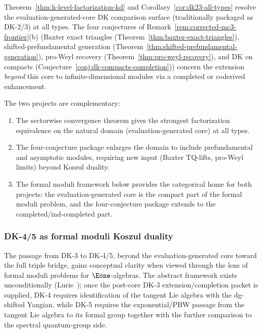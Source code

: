 \begin{remark}
\label{rem:h-level-vs-four-conjectures}
Theorem~\ref{thm:h-level-factorization-kd} and
Corollary~\ref{cor:dk23-all-types} resolve the
evaluation-generated-core DK comparison surface
\textup{(}traditionally packaged as DK-2/3\textup{)} at all types.
The four conjectures of
Remark~\ref{rem:corrected-mc3-frontier}(b)
(Baxter exact triangles
(Theorem~\ref{thm:baxter-exact-triangles}),
shifted-prefundamental generation
(Theorem~\ref{thm:shifted-prefundamental-generation}),
pro-Weyl recovery (Theorem~\ref{thm:pro-weyl-recovery}), and
DK on compacts
(Conjecture~\ref{conj:dk-compacts-completion}))
concern the extension \emph{beyond} this core to
infinite-dimensional modules via a completed or coderived
enhancement.

The two projects are complementary:
\begin{enumerate}[label=\textup{(\alph*)}]
\item The sectorwise convergence theorem gives the strongest
 factorization equivalence on the natural domain
 (evaluation-generated core) at all types.
\item The four-conjecture package enlarges the domain to include
 prefundamental and asymptotic modules, requiring new input
 (Baxter TQ-lifts, pro-Weyl limits) beyond Koszul duality.
\item The formal moduli framework below provides the categorical
 home for both projects: the evaluation-generated core is the
 compact part of the formal moduli problem, and the four-conjecture
 package extends to the completed/ind-completed part.
\end{enumerate}
\end{remark}

\subsubsection*{DK-4/5 as formal moduli Koszul duality}

The passage from DK-3 to DK-4/5, beyond the evaluation-generated
core toward the full triple bridge, gains conceptual clarity when
viewed through the lens of formal moduli problems for
$\Eone$-algebras. The abstract framework exists
unconditionally (Lurie~\cite{LurieDAGX}); once the post-core DK-3
extension/completion packet is supplied, DK-4 requires
identification of the tangent Lie algebra with the dg-shifted
Yangian, while DK-5 requires the exponential/PBW passage from
the tangent Lie algebra to its formal group together with the
further comparison to the spectral quantum-group side.


